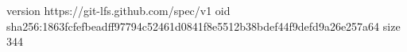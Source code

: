 version https://git-lfs.github.com/spec/v1
oid sha256:1863fcfefbeadff97794c52461d0841f8e5512b38bdef44f9defd9a26e257a64
size 344
